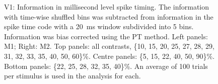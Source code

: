 \begin{figure}[htbp]
\begin{subfigure}[b]{0.5\linewidth}
    \end{subfigure}
    \caption{\ac{V1}: Information in millisecond level spike timing.
The information with time-wise shuffled bins was subtracted from information in the spike time code with a \SI{20}{ms} window subdivided into 5 bins.
Information was bias corrected using the \ac{PT} method.
Left panels: \ac{M1}; Right: \ac{M2}.
Top panels: all contrasts, \{10, 15, 20, 25, 27, 28, 29, 31, 32, 33, 35, 40, 50, 60\}\%.
Centre panels: \{5, 15, 22, 40, 50, 90\}\%.
Bottom panels: \{22, 25, 28, 32, 35, 40\}\%.
An average of 100 trials per stimulus is used in the analysis for each.
}
    \label{fig:v1-dif}
\end{figure}


% 


